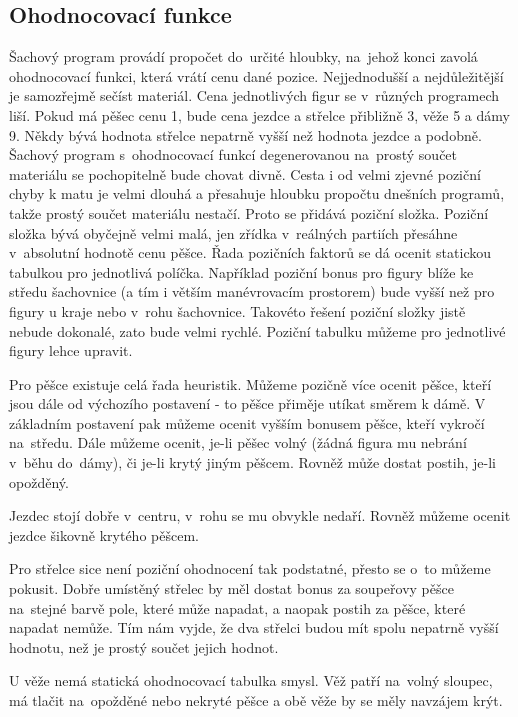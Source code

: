 \documentclass[11pt, titlepage]{article}
\begin{document}
\subsection{Ohodnocovací funkce}

Šachový program provádí propočet do~určité hloubky, na~jehož konci zavolá ohodnocovací funkci, která vrátí cenu dané pozice. Nejjednodušší a nejdůležitější je samozřejmě sečíst materiál. Cena jednotlivých figur se v~různých programech liší. Pokud má pěšec cenu 1, bude cena jezdce a střelce přibližně 3, věže 5 a dámy 9. Někdy bývá hodnota střelce nepatrně vyšší než hodnota jezdce a podobně. Šachový program s~ohodnocovací funkcí degenerovanou na~prostý součet materiálu se pochopitelně bude chovat divně. Cesta i od velmi zjevné poziční chyby k matu je velmi dlouhá a přesahuje hloubku propočtu dnešních programů, takže prostý součet materiálu nestačí. Proto se přidává poziční složka.
Poziční složka bývá obyčejně velmi malá, jen zřídka v~reálných partiích přesáhne v~absolutní hodnotě cenu pěšce. Řada pozičních faktorů se dá ocenit statickou tabulkou pro jednotlivá políčka. Například poziční bonus pro figury blíže ke středu šachovnice (a tím i větším manévrovacím prostorem) bude vyšší než pro figury u kraje nebo v~rohu šachovnice. Takovéto řešení poziční složky jistě nebude dokonalé, zato bude velmi rychlé. Poziční tabulku můžeme pro jednotlivé figury lehce upravit.

Pro pěšce existuje celá řada heuristik. Můžeme pozičně více ocenit pěšce, kteří jsou dále od výchozího postavení - to pěšce přiměje utíkat směrem k dámě. V základním postavení pak můžeme ocenit vyšším bonusem pěšce, kteří vykročí na~středu. Dále můžeme ocenit, je-li pěšec volný (žádná figura mu nebrání v~běhu do~dámy), či je-li krytý jiným pěšcem. Rovněž může dostat postih, je-li opožděný.

Jezdec stojí dobře v~centru, v~rohu se mu obvykle nedaří. Rovněž můžeme ocenit jezdce šikovně krytého pěšcem.

Pro střelce sice není poziční ohodnocení tak podstatné, přesto se o~to můžeme pokusit. Dobře umístěný střelec by měl dostat bonus za soupeřovy pěšce na~stejné barvě pole, které může napadat, a naopak postih za pěšce, které napadat nemůže. Tím nám vyjde, že dva střelci budou mít spolu nepatrně vyšší hodnotu, než je prostý součet jejich hodnot.

U věže nemá statická ohodnocovací tabulka smysl. Věž patří na~volný sloupec, má tlačit na~opožděné nebo nekryté pěšce a obě věže by se měly navzájem krýt.
\end{document}
